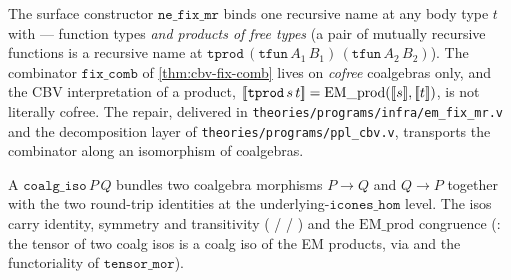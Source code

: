 The surface constructor $\mathtt{ne\_fix\_mr}$ binds one recursive
name at any body type $t$ with
 --- function types
\emph{and products of free types} (a pair of mutually recursive
functions is a recursive name at
$\mathtt{tprod}\,(\mathtt{tfun}\,A_1\,B_1)\,(\mathtt{tfun}\,A_2\,B_2)$).
The combinator $\mathtt{fix\_comb}$ of \autoref{thm:cbv-fix-comb}
lives on \emph{cofree} coalgebras only, and the CBV interpretation of
a product, $[\![ \mathtt{tprod}\,s\,t ]\!] = \mathrm{EM\_prod}([\![ s ]\!],
[\![ t ]\!])$, is not literally cofree. The repair, delivered in
\texttt{theories/programs/infra/em\_fix\_mr.v} and the decomposition
layer of \texttt{theories/programs/ppl\_cbv.v}, transports the
combinator along an isomorphism of coalgebras.

\begin{definition}%
\label{def:cbv-coalg-iso}
\rocqok
{}\rocqok
{}\rocqok
{}\rocqok
{}\rocqok
{}
A $\mathtt{coalg\_iso}\,P\,Q$ bundles two coalgebra morphisms
$P \to Q$ and $Q \to P$ together with the two round-trip identities
at the underlying-$\mathtt{icones\_hom}$ level. The isos carry
identity, symmetry and transitivity
( /
 /
) and the
$\mathrm{EM\_prod}$ congruence
(: the tensor of
two coalg isos is a coalg iso of the EM products, via
 and the
functoriality of $\mathtt{tensor\_mor}$).
\end{definition}

